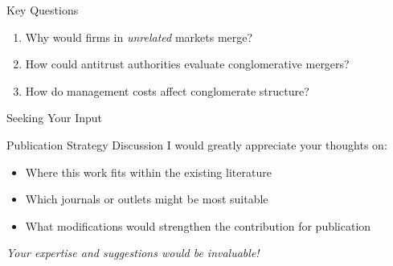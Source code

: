 \documentclass[aspectratio=169]{beamer}
\begin{document}
\begin{frame}{Key Questions}
  
  \begin{enumerate}
    \setlength\itemsep{0.8em}
    \item Why would firms in \textit{unrelated} markets merge? 
    \item How could antitrust authorities evaluate conglomerative mergers?
    \item How do management costs affect conglomerate structure?
  \end{enumerate}

\end{frame}

\begin{frame}{Seeking Your Input}
    \begin{block}{Publication Strategy Discussion}
      I would greatly appreciate your thoughts on:
      \begin{itemize}
        \setlength\itemsep{0.8em}
        \item Where this work fits within the existing literature
        \item Which journals or outlets might be most suitable
        \item What modifications would strengthen the contribution for
  publication
      \end{itemize}
    \end{block}

    \vspace{0.5cm}
    \centering
    \textit{Your expertise and suggestions would be invaluable!}
\end{frame}

\end{document}

